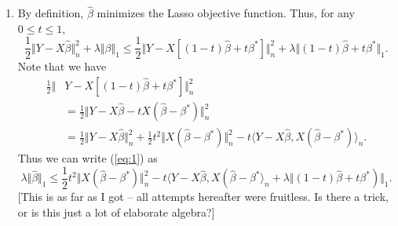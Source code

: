 \documentclass[12pt]{article}
\begin{document}
\begin{enumerate}
\item
By definition, $\hat{\beta}$ minimizes the Lasso objective function. Thus, for any $0 \leq t \leq 1$,
\begin{equation} \label{eq:1}
\frac{1}{2} \Vert Y - X\hat{\beta} \Vert_n^2 + \lambda \Vert \beta \Vert_1 \leq \frac{1}{2} \Vert Y - X[(1-t)\hat{\beta} + t\beta^*] \Vert_n^2 + \lambda \Vert (1-t)\hat{\beta} + t\beta^* \Vert_1.
\end{equation}
Note that we have
\begin{align*}
\frac{1}{2} \Vert& Y - X[(1-t)\hat{\beta} + t\beta^*] \Vert_n^2 \\
&= \frac{1}{2} \Vert Y - X\hat{\beta} - tX(\hat{\beta} - \beta^*) \Vert_n^2 \\
&= \frac{1}{2} \Vert Y - X\hat{\beta} \Vert_n^2 + \frac{1}{2}t^2 \Vert X(\hat{\beta} - \beta^*) \Vert_n^2 - t \langle Y - X\hat{\beta}, X(\hat{\beta} - \beta^*) \rangle_n.
\end{align*}
Thus we can write (\ref{eq:1}) as
\begin{equation*}
\lambda \Vert \hat{\beta} \Vert_1 \leq \frac{1}{2}t^2 \Vert X(\hat{\beta} - \beta^*) \Vert_n^2 - t \langle Y - X\hat{\beta}, X(\hat{\beta} - \beta^* \rangle_n + \lambda \Vert (1-t)\hat{\beta} + t\beta^*) \Vert_1.
\end{equation*}
[This is as far as I got -- all attempts hereafter were fruitless. Is there a trick, or is this just a lot of elaborate algebra?]

\end{enumerate}
\end{document}
